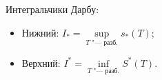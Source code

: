 
 	Интегральчики Дарбу:
 	\begin{itemize}
 	  \item Нижний: $I_*=\sup\limits_{T\text{ "--- разб.}}s_*(T)$;
 	  \item Верхний: $I^*=\inf\limits_{T\text{ "--- разб.}} S^*(T)$.
 	\end{itemize}
 